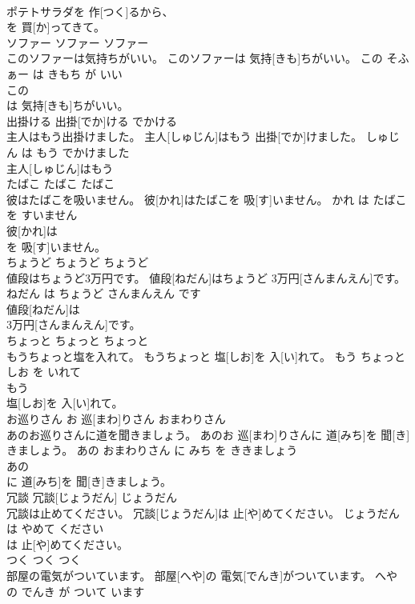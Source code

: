 \documentclass[8pt]{extreport}
\begin{document}
\begin{CJK}{UTF8}{min}
\\	ポテトサラダを 作[つく]るから、
\\	を 買[か]ってきて。			
\\	ソファー	ソファー	ソファー	
\\	このソファーは気持ちがいい。	このソファーは 気持[きも]ちがいい。	この そふぁー は きもち が いい	
\\	この
\\	は 気持[きも]ちがいい。			
\\	出掛ける	出掛[でか]ける	でかける	
\\	主人はもう出掛けました。	主人[しゅじん]はもう 出掛[でか]けました。	しゅじん は もう でかけました	
\\	主人[しゅじん]はもう
\\	たばこ	たばこ	たばこ	
\\	彼はたばこを吸いません。	彼[かれ]はたばこを 吸[す]いません。	かれ は たばこ を すいません	
\\	彼[かれ]は
\\	を 吸[す]いません。			
\\	ちょうど	ちょうど	ちょうど	
\\	値段はちょうど3万円です。	値段[ねだん]はちょうど 3万円[さんまんえん]です。	ねだん は ちょうど さんまんえん です	
\\	値段[ねだん]は
\\	3万円[さんまんえん]です。			
\\	ちょっと	ちょっと	ちょっと	
\\	もうちょっと塩を入れて。	もうちょっと 塩[しお]を 入[い]れて。	もう ちょっと しお を いれて	
\\	もう
\\	塩[しお]を 入[い]れて。			
\\	お巡りさん	お 巡[まわ]りさん	おまわりさん	
\\	あのお巡りさんに道を聞きましょう。	あのお 巡[まわ]りさんに 道[みち]を 聞[き]きましょう。	あの おまわりさん に みち を ききましょう	
\\	あの
\\	に 道[みち]を 聞[き]きましょう。			
\\	冗談	冗談[じょうだん]	じょうだん	
\\	冗談は止めてください。	冗談[じょうだん]は 止[や]めてください。	じょうだん は やめて ください	
\\	は 止[や]めてください。			
\\	つく	つく	つく	
\\	部屋の電気がついています。	部屋[へや]の 電気[でんき]がついています。	へや の でんき が ついて います	

\end{CJK}
\end{document}
